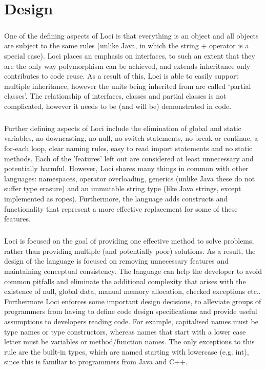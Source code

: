 \documentclass[12pt,twoside,notitlepage]{report}
\begin{document}
\cleardoublepage

\chapter{Design}

\paragraph{}
One of the defining aspects of Loci is that everything is an object and all objects are subject to the same rules (unlike Java, in which the string + operator is a special case). Loci places an emphasis on interfaces, to such an extent that they are the only way polymorphism can be achieved, and extends inheritance only contributes to code reuse. As a result of this, Loci is able to easily support multiple inheritance, however the units being inherited from are called ‘partial classes’. The relationship of interfaces, classes and partial classes is not complicated, however it needs to be (and will be) demonstrated in code.

\paragraph{}
Further defining aspects of Loci include the elimination of global and static variables, no downcasting, no null, no switch statements, no break or continue, a for-each loop, clear naming rules, easy to read import statements and no static methods. Each of the 'features' left out are considered at least unnecessary and potentially harmful. However, Loci shares many things in common with other languages: namespaces, operator overloading, generics (unlike Java these do not suffer type erasure) and an immutable string type (like Java strings, except implemented as ropes). Furthermore, the language adds constructs and functionality that represent a more effective replacement for some of these features.

\paragraph{}
Loci is focused on the goal of providing one effective method to solve problems, rather than providing multiple (and potentially poor) solutions. As a result, the design of the language is focused on removing unnecessary features and maintaining conceptual consistency. The language can help the developer to avoid common pitfalls and eliminate the additional complexity that arises with the existence of null, global data, manual memory allocation, checked exceptions etc.. Furthermore Loci enforces some important design decisions, to alleviate groups of programmers from having to define code design specifications and provide useful assumptions to developers reading code. For example, capitalised names must be type names or type constructors, whereas names that start with a lower case letter must be variables or method/function names. The only exceptions to this rule are the built-in types, which are named starting with lowercase (e.g. int), since this is familiar to programmers from Java and C++.
\end{document}
